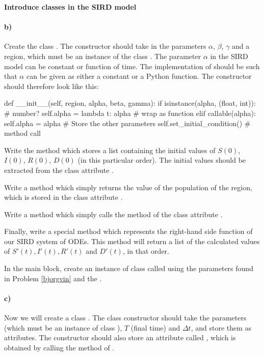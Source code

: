 \begin{Problem}{\textbf{Introduce classes in the SIRD model}}
\paragraph{b)}
 Create the class .  The constructor should take in the parameters $\alpha$, $\beta$, $\gamma$ and a region, which must be an instance of the class . The parameter $\alpha$ in the SIRD model can be constant or function of time. The implementation of  should be such that $\alpha$ can be given as either a constant or a Python function. The constructor should therefore look like this:
\begin{python}
def __init__(self, region, alpha, beta, gamma):
    if isinstance(alpha, (float, int)): # number?
        self.alpha = lambda t: alpha    # wrap as function 
    elif callable(alpha):
        self.alpha = alpha
    # Store the other parameters
    self.set_initial_condition()        # method call
\end{python}

Write the method  which stores a list \newline {} containing the initial values of $S(0)$, $I(0)$, $R(0)$, $D(0)$ (in this particular order). The initial values should be extracted from the class attribute .

Write a method  which simply returns the value of the population of the region, which is stored in the class attribute .

Write a method  which simply calls the method  of the class attribute .

Finally, write a special method  which represents the right-hand side function of our SIRD system  of ODEs. This method will return a list of the calculated values of $S'(t), I'(t), R'(t)$ and $D'(t)$, in that order. 


In the main block, create an instance of class  called  using the parameters found in Problem \ref{bjorgvin} and the .

\paragraph{c)}
Now we will create a class . The class constructor should take the parameters  (which must be an instance of class ), $T$ (final time) and $\Delta t$, and store them as attributes. The constructor should also store  an attribute called , which is obtained by calling the  method of .


\end{Problem}
